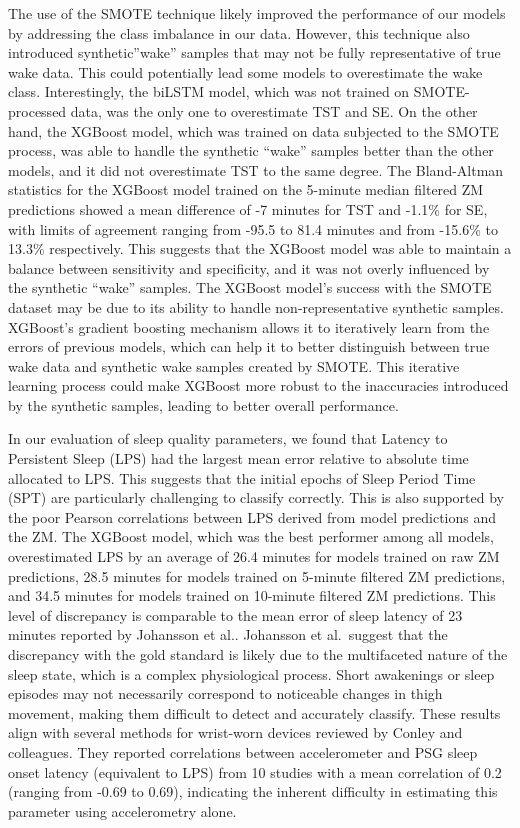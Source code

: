 \documentclass[
  super,
  preprint,
  3p]{elsarticle}
\begin{document}
The use of the SMOTE technique likely improved the performance of our
models by addressing the class imbalance in our data. However, this
technique also introduced synthetic''wake'' samples that may not be
fully representative of true wake data. This could potentially lead some
models to overestimate the wake class. Interestingly, the biLSTM model,
which was not trained on SMOTE-processed data, was the only one to
overestimate TST and SE. On the other hand, the XGBoost model, which was
trained on data subjected to the SMOTE process, was able to handle the
synthetic ``wake'' samples better than the other models, and it did not
overestimate TST to the same degree. The Bland-Altman statistics for the
XGBoost model trained on the 5-minute median filtered ZM predictions
showed a mean difference of -7 minutes for TST and -1.1\% for SE, with
limits of agreement ranging from -95.5 to 81.4 minutes and from -15.6\%
to 13.3\% respectively. This suggests that the XGBoost model was able to
maintain a balance between sensitivity and specificity, and it was not
overly influenced by the synthetic ``wake'' samples. The XGBoost model's
success with the SMOTE dataset may be due to its ability to handle
non-representative synthetic samples. XGBoost's gradient boosting
mechanism allows it to iteratively learn from the errors of previous
models, which can help it to better distinguish between true wake data
and synthetic wake samples created by SMOTE. This iterative learning
process could make XGBoost more robust to the inaccuracies introduced by
the synthetic samples, leading to better overall performance.

In our evaluation of sleep quality parameters, we found that Latency to
Persistent Sleep (LPS) had the largest mean error relative to absolute
time allocated to LPS. This suggests that the initial epochs of Sleep
Period Time (SPT) are particularly challenging to classify correctly.
This is also supported by the poor Pearson correlations between LPS
derived from model predictions and the ZM. The XGBoost model, which was
the best performer among all models, overestimated LPS by an average of
26.4 minutes for models trained on raw ZM predictions, 28.5 minutes for
models trained on 5-minute filtered ZM predictions, and 34.5 minutes for
models trained on 10-minute filtered ZM predictions. This level of
discrepancy is comparable to the mean error of sleep latency of 23
minutes reported by Johansson et al.\citep{johansson_development_2023}.
Johansson et al.~suggest that the discrepancy with the gold standard is
likely due to the multifaceted nature of the sleep state, which is a
complex physiological process. Short awakenings or sleep episodes may
not necessarily correspond to noticeable changes in thigh movement,
making them difficult to detect and accurately classify. These results
align with several methods for wrist-worn devices reviewed by Conley and
colleagues\citep{conley2019}. They reported correlations between
accelerometer and PSG sleep onset latency (equivalent to LPS) from 10
studies with a mean correlation of 0.2 (ranging from -0.69 to 0.69),
indicating the inherent difficulty in estimating this parameter using
accelerometry alone.
\end{document}
